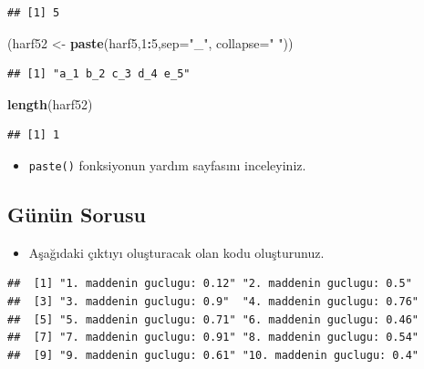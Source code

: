\documentclass[
  oneside]{book}
\newenvironment{Shaded}{\begin{snugshade}}{\end{snugshade}}
\newcommand{\AttributeTok}[1]{\textcolor[rgb]{0.13,0.29,0.53}{#1}}
\newcommand{\DecValTok}[1]{\textcolor[rgb]{0.00,0.00,0.81}{#1}}
\newcommand{\FunctionTok}[1]{\textcolor[rgb]{0.13,0.29,0.53}{\textbf{#1}}}
\newcommand{\NormalTok}[1]{#1}
\newcommand{\OtherTok}[1]{\textcolor[rgb]{0.56,0.35,0.01}{#1}}
\newcommand{\SpecialCharTok}[1]{\textcolor[rgb]{0.81,0.36,0.00}{\textbf{#1}}}
\newcommand{\StringTok}[1]{\textcolor[rgb]{0.31,0.60,0.02}{#1}}
\providecommand{\tightlist}{%
  \setlength{\itemsep}{0pt}\setlength{\parskip}{0pt}}
\begin{document}
\begin{verbatim}
## [1] 5
\end{verbatim}

\begin{Shaded}
\begin{Highlighting}[]
\NormalTok{(harf52 }\OtherTok{\textless{}{-}} \FunctionTok{paste}\NormalTok{(harf5,}\DecValTok{1}\SpecialCharTok{:}\DecValTok{5}\NormalTok{,}\AttributeTok{sep=}\StringTok{"\_"}\NormalTok{,}
                 \AttributeTok{collapse=}\StringTok{" "}\NormalTok{))}
\end{Highlighting}
\end{Shaded}

\begin{verbatim}
## [1] "a_1 b_2 c_3 d_4 e_5"
\end{verbatim}

\begin{Shaded}
\begin{Highlighting}[]
\FunctionTok{length}\NormalTok{(harf52)}
\end{Highlighting}
\end{Shaded}

\begin{verbatim}
## [1] 1
\end{verbatim}

\begin{itemize}
\tightlist
\item
  \texttt{paste()} fonksiyonun yardım sayfasını inceleyiniz.
\end{itemize}

\hypertarget{guxfcnuxfcn-sorusu}{%
\subsection{Günün Sorusu}\label{guxfcnuxfcn-sorusu}}

\begin{itemize}
\tightlist
\item
  Aşağıdaki çıktıyı oluşturacak olan kodu oluşturunuz.
\end{itemize}

\begin{verbatim}
##  [1] "1. maddenin guclugu: 0.12" "2. maddenin guclugu: 0.5" 
##  [3] "3. maddenin guclugu: 0.9"  "4. maddenin guclugu: 0.76"
##  [5] "5. maddenin guclugu: 0.71" "6. maddenin guclugu: 0.46"
##  [7] "7. maddenin guclugu: 0.91" "8. maddenin guclugu: 0.54"
##  [9] "9. maddenin guclugu: 0.61" "10. maddenin guclugu: 0.4"
\end{verbatim}
\end{document}
